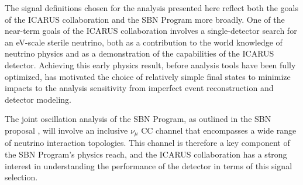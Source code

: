 The signal definitions chosen for the analysis presented here reflect both the goals of the ICARUS collaboration and the SBN Program more broadly. One of the near-term goals of the ICARUS collaboration involves a single-detector search for an eV-scale sterile neutrino, both as a contribution to the world knowledge of neutrino physics and as a demonstration of the capabilities of the ICARUS detector. Achieving this early physics result, before analysis tools have been fully optimized, has motivated the choice of relatively simple final states to minimize impacts to the analysis sensitivity from imperfect event reconstruction and detector modeling. 

The joint oscillation analysis of the SBN Program, as outlined in the SBN proposal \cite{Acciarri2015}, will involve an inclusive $\nu_\mu$ CC channel that encompasses a wide range of neutrino interaction topologies. This channel is therefore a key component of the SBN Program's physics reach, and the ICARUS collaboration has a strong interest in understanding the performance of the detector in terms of this signal selection.